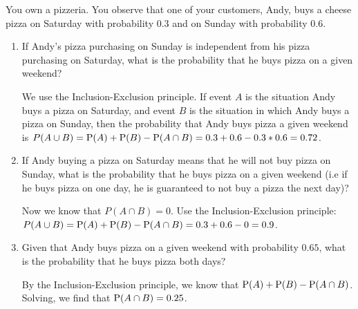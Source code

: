 \question You own a pizzeria. You observe that one of your customers, Andy, buys a cheese pizza on Saturday with probability $0.3$ and on Sunday with probability $0.6.$ 

\begin{enumerate}[label=(\alph*)]
    \item If Andy's pizza purchasing on Sunday is independent from his pizza purchasing on Saturday, what is the probability that he buys pizza on a given weekend?
    \begin{solution}[.5 cm] We use the Inclusion-Exclusion principle. If event $A$ is the situation Andy buys a  pizza on Saturday, and event $B$ is the situation in which Andy buys a pizza on Sunday, then the probability that Andy buys pizza a given weekend is $P(A\cup B) = \P(A) + \P(B) - \P(A\cap B) = 0.3 + 0.6 - 0.3*0.6 = 0.72$.
    \end{solution}
    \item If Andy buying a pizza on Saturday means that he will not buy pizza on Sunday, what is the probability that he buys pizza on a given weekend (i.e if he buys pizza on one day, he is guaranteed to not buy a pizza the next day)?
     \begin{solution}[.5 cm] Now we know that $P(A\cap B) = 0$. Use the Inclusion-Exclusion principle: $P(A\cup B) = \P(A) + \P(B) - \P(A\cap B) = 0.3 + 0.6 - 0 = 0.9$.
      \end{solution}
    \item Given that Andy buys pizza on a given weekend with probability $0.65$, what is the probability that he buys pizza both days?
    \begin{solution}[.5 cm] By the Inclusion-Exclusion principle, we know that $\P(A) + \P(B) - \P(A\cap B)$. Solving, we find that $\P(A\cap B) = 0.25$.
    \end{solution}
 \end{enumerate}